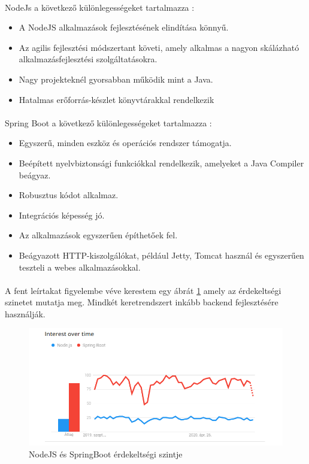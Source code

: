 	\paragraph{}
	NodeJs a következő különlegességeket tartalmazza \cite{nodejsspring}:
	\begin{itemize}
		\item A NodeJS alkalmazások fejlesztésének elindítása könnyű.
		\item Az agilis fejlesztési módszertant követi, amely alkalmas a nagyon skálázható alkalmazásfejlesztési szolgáltatásokra.
		\item Nagy projekteknél gyorsabban működik mint a Java.
		\item Hatalmas erőforrás-készlet könyvtárakkal rendelkezik
	\end{itemize}
	
	\paragraph{}
	Spring Boot a következő különlegességeket tartalmazza \cite{nodejsspring}:
	\begin{itemize}
		\item Egyszerű, minden eszköz és operációs rendszer támogatja.
		\item Beépített nyelvbiztonsági funkciókkal rendelkezik, amelyeket a Java Compiler beágyaz.
		\item Robusztus kódot alkalmaz.
		\item Integrációs képesség jó.
		\item Az alkalmazások egyszerűen építhetőek fel.
		\item Beágyazott HTTP-kiszolgálókat, például Jetty, Tomcat használ és egyszerűen teszteli a webes alkalmazásokkal.
	\end{itemize}
	
	\paragraph{}
	A fent leírtakat figyelembe véve kerestem egy ábrát \ref{nodespring} amely az érdekeltségi szinetet mutatja meg.\cite{nodejsspring1} Mindkét keretrendszert inkább backend fejlesztésére használják.
	
	\begin{figure}
		\centering
		\includegraphics[scale=0.6]{figures/images/nodespring.png}
		\caption{NodeJS és SpringBoot érdekeltségi szintje}
		\label{nodespring}
	\end{figure}